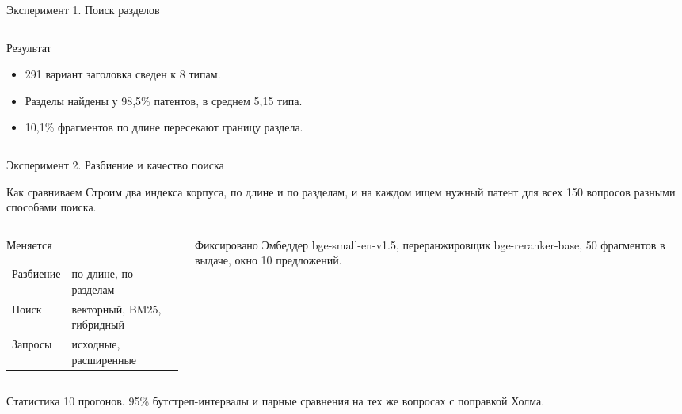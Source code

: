 \documentclass[aspectratio=169]{beamer}
\begin{document}
\begin{frame}{Эксперимент 1. Поиск разделов}
\begin{columns}[T]
\begin{column}{0.48\textwidth}
            \medskip
            \begin{exampleblock}{Результат}
                \begin{itemize}
                    \item 291 вариант заголовка сведен к 8 типам.
                    \item Разделы найдены у 98,5\% патентов, в среднем 5,15 типа.
                    \item 10,1\% фрагментов по длине пересекают границу раздела.
                \end{itemize}
            \end{exampleblock}
        \end{column}
    \end{columns}
\end{frame}

\begin{frame}{Эксперимент 2. Разбиение и качество поиска}
    \small
    \begin{block}{Как сравниваем}
        Строим два индекса корпуса, по длине и по разделам, и на каждом ищем нужный патент для всех 150 вопросов разными способами поиска.
    \end{block}
    \begin{columns}[T]
        \begin{column}{0.48\textwidth}
            \begin{block}{Меняется}
                \begin{tabular}{@{}ll@{}}
                    Разбиение & по длине, по разделам \\
                    Поиск & векторный, BM25, гибридный \\
                    Запросы & исходные, расширенные \\
                \end{tabular}
            \end{block}
        \end{column}
        \begin{column}{0.48\textwidth}
            \begin{block}{Фиксировано}
                Эмбеддер bge-small-en-v1.5, переранжировщик bge-reranker-base, 50 фрагментов в выдаче, окно 10 предложений.
            \end{block}
        \end{column}
    \end{columns}
    \begin{exampleblock}{Статистика}
        10 прогонов. 95\% бутстреп-интервалы и парные сравнения на тех же вопросах с поправкой Холма.
    \end{exampleblock}
\end{frame}
\end{document}
